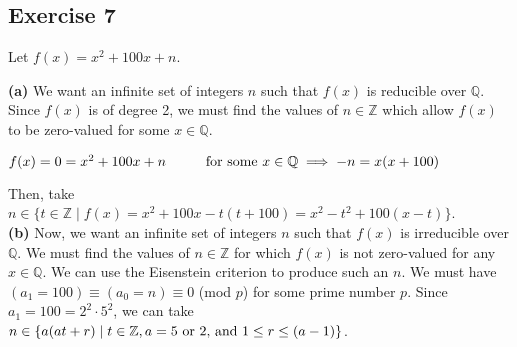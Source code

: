 \subsection*{Exercise 7}
Let $f(x) = x^2 + 100x + n$.

\textbf{(a)} We want an infinite set of integers $n$ such that $f(x)$ is reducible over $\mathbb{Q}$. Since $f(x)$ is of degree 2, we must find the values of $n \in \mathbb{Z}$ which allow $f(x)$ to be zero-valued for some $x \in \mathbb{Q}$.

$f(x) = 0 = x^2 + 100x + n \hspace{10mm} \textnormal{for some } x \in \mathbb{Q} \\
\implies -n = x(x + 100)$

Then, take $n \in \{t \in \mathbb{Z} \mid f(x) = x^2 + 100x - t(t + 100) = x^2 - t^2 + 100(x - t)\}$. \\

\textbf{(b)} Now, we want an infinite set of integers $n$ such that $f(x)$ is irreducible over $\mathbb{Q}$. We must find the values of $n \in \mathbb{Z}$ for which $f(x)$ is not zero-valued for any $x \in \mathbb{Q}$. We can use the Eisenstein criterion to produce such an $n$. We must have $(a_1 = 100) \equiv (a_0 = n) \equiv 0$ (mod $p$) for some prime number $p$. Since $a_1 = 100 = 2^2\cdot5^2$, we can take $n \in \{ a(at + r) \mid t \in \mathbb{Z}, a = 5 \textnormal{ or 2, and } 1 \le r \le (a-1) \}$.